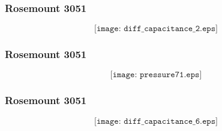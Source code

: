 \documentclass[aspectratio=169,xcolor=dvipsnames]{beamer}
\begin{document}
%
%
%
%
\begin{frame}
	\frametitle{Rosemount 3051}

	$$\texttt{[image: diff\_capacitance\_2.eps]}$$
\end{frame}
%
%
%
%
\begin{frame}
	\frametitle{Rosemount 3051}

	$$\texttt{[image: pressure71.eps]}$$
\end{frame}
%
%
%
%
\begin{frame}
	\frametitle{Rosemount 3051}

	$$\texttt{[image: diff\_capacitance\_6.eps]}$$
\end{frame}
\end{document}
